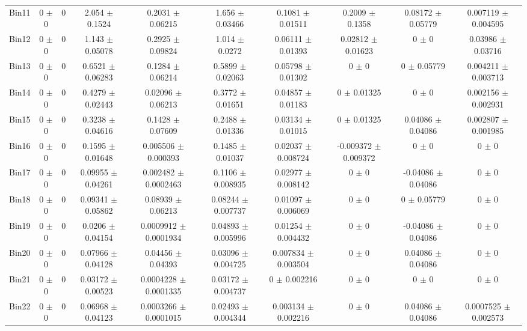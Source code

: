 \begin{tabular}{@{\extracolsep{4pt}}lccccccccc@{}}
     Bin11 & 0 $\pm$ 0 & 0 & 2.054 $\pm$ 0.1524 & 0.2031 $\pm$ 0.06215 & 1.656 $\pm$ 0.03466 & 0.1081 $\pm$ 0.01511 & 0.2009 $\pm$ 0.1358 & 0.08172 $\pm$ 0.05779 & 0.007119 $\pm$ 0.004595 \\ 
     Bin12 & 0 $\pm$ 0 & 0 & 1.143 $\pm$ 0.05078 & 0.2925 $\pm$ 0.09824 & 1.014 $\pm$ 0.0272 & 0.06111 $\pm$ 0.01393 & 0.02812 $\pm$ 0.01623 & 0 $\pm$ 0 & 0.03986 $\pm$ 0.03716 \\ 
     Bin13 & 0 $\pm$ 0 & 0 & 0.6521 $\pm$ 0.06283 & 0.1284 $\pm$ 0.06214 & 0.5899 $\pm$ 0.02063 & 0.05798 $\pm$ 0.01302 & 0 $\pm$ 0 & 0 $\pm$ 0.05779 & 0.004211 $\pm$ 0.003713 \\ 
     Bin14 & 0 $\pm$ 0 & 0 & 0.4279 $\pm$ 0.02443 & 0.02096 $\pm$ 0.06213 & 0.3772 $\pm$ 0.01651 & 0.04857 $\pm$ 0.01183 & 0 $\pm$ 0.01325 & 0 $\pm$ 0 & 0.002156 $\pm$ 0.002931 \\ 
     Bin15 & 0 $\pm$ 0 & 0 & 0.3238 $\pm$ 0.04616 & 0.1428 $\pm$ 0.07609 & 0.2488 $\pm$ 0.01336 & 0.03134 $\pm$ 0.01015 & 0 $\pm$ 0.01325 & 0.04086 $\pm$ 0.04086 & 0.002807 $\pm$ 0.001985 \\ 
     Bin16 & 0 $\pm$ 0 & 0 & 0.1595 $\pm$ 0.01648 & 0.005506 $\pm$ 0.000393 & 0.1485 $\pm$ 0.01037 & 0.02037 $\pm$ 0.008724 & -0.009372 $\pm$ 0.009372 & 0 $\pm$ 0 & 0 $\pm$ 0 \\ 
     Bin17 & 0 $\pm$ 0 & 0 & 0.09955 $\pm$ 0.04261 & 0.002482 $\pm$ 0.0002463 & 0.1106 $\pm$ 0.008935 & 0.02977 $\pm$ 0.008142 & 0 $\pm$ 0 & -0.04086 $\pm$ 0.04086 & 0 $\pm$ 0 \\ 
     Bin18 & 0 $\pm$ 0 & 0 & 0.09341 $\pm$ 0.05862 & 0.08939 $\pm$ 0.06213 & 0.08244 $\pm$ 0.007737 & 0.01097 $\pm$ 0.006069 & 0 $\pm$ 0 & 0 $\pm$ 0.05779 & 0 $\pm$ 0 \\ 
     Bin19 & 0 $\pm$ 0 & 0 & 0.0206 $\pm$ 0.04154 & 0.0009912 $\pm$ 0.0001934 & 0.04893 $\pm$ 0.005996 & 0.01254 $\pm$ 0.004432 & 0 $\pm$ 0 & -0.04086 $\pm$ 0.04086 & 0 $\pm$ 0 \\ 
     Bin20 & 0 $\pm$ 0 & 0 & 0.07966 $\pm$ 0.04128 & 0.04456 $\pm$ 0.04393 & 0.03096 $\pm$ 0.004725 & 0.007834 $\pm$ 0.003504 & 0 $\pm$ 0 & 0.04086 $\pm$ 0.04086 & 0 $\pm$ 0 \\ 
     Bin21 & 0 $\pm$ 0 & 0 & 0.03172 $\pm$ 0.00523 & 0.0004228 $\pm$ 0.0001335 & 0.03172 $\pm$ 0.004737 & 0 $\pm$ 0.002216 & 0 $\pm$ 0 & 0 $\pm$ 0 & 0 $\pm$ 0 \\ 
     Bin22 & 0 $\pm$ 0 & 0 & 0.06968 $\pm$ 0.04123 & 0.0003266 $\pm$ 0.0001015 & 0.02493 $\pm$ 0.004344 & 0.003134 $\pm$ 0.002216 & 0 $\pm$ 0 & 0.04086 $\pm$ 0.04086 & 0.0007525 $\pm$ 0.002573 \\ 

\end{tabular}
